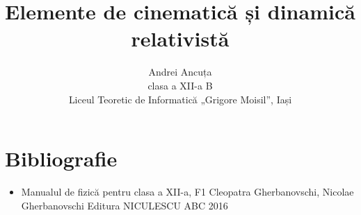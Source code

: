 \documentclass[a4paper, 12pt]{article}
\title{Elemente de cinematică și dinamică relativistă}
\author{Andrei Ancuța \\ clasa a XII-a B \\ Liceul Teoretic de Informatică „Grigore Moisil”, Iași}
\def\\{}%
\newcommand{\mktitle}{%
    \noindent
    {\small\theauthor}

    \begin{center}
        \LARGE\thetitle
    \end{center}
}
\begin{document}
\mktitle
\tableofcontents




\clearpage


\clearpage

\section*{Bibliografie}
\begin{itemize}
    \item Manualul de fizică pentru clasa a XII-a, F1 \\
        Cleopatra Gherbanovschi, Nicolae Gherbanovschi \\
        Editura NICULESCU ABC \\
        2016
\end{itemize}
\end{document}
